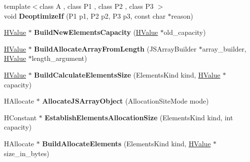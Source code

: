 \begin{DoxyCompactItemize}
\item 
\hypertarget{classv8_1_1internal_1_1_h_graph_builder_a66f8a692fe2de68eeace6a5cfad72efe}{}{\footnotesize template$<$class A , class P1 , class P2 , class P3 $>$ }\\void {\bfseries Deoptimize\+If} (P1 p1, P2 p2, P3 p3, const char $\ast$reason)\label{classv8_1_1internal_1_1_h_graph_builder_a66f8a692fe2de68eeace6a5cfad72efe}

\item 
\hypertarget{classv8_1_1internal_1_1_h_graph_builder_aae8a99189e14174540b8e6720b39fb76}{}\hyperlink{classv8_1_1internal_1_1_h_value}{H\+Value} $\ast$ {\bfseries Build\+New\+Elements\+Capacity} (\hyperlink{classv8_1_1internal_1_1_h_value}{H\+Value} $\ast$old\+\_\+capacity)\label{classv8_1_1internal_1_1_h_graph_builder_aae8a99189e14174540b8e6720b39fb76}

\item 
\hypertarget{classv8_1_1internal_1_1_h_graph_builder_a13b29de0ba2ac4d2683acec621ae783d}{}\hyperlink{classv8_1_1internal_1_1_h_value}{H\+Value} $\ast$ {\bfseries Build\+Allocate\+Array\+From\+Length} (J\+S\+Array\+Builder $\ast$array\+\_\+builder, \hyperlink{classv8_1_1internal_1_1_h_value}{H\+Value} $\ast$length\+\_\+argument)\label{classv8_1_1internal_1_1_h_graph_builder_a13b29de0ba2ac4d2683acec621ae783d}

\item 
\hypertarget{classv8_1_1internal_1_1_h_graph_builder_a993d18a4444924ee5dcee91fedfab723}{}\hyperlink{classv8_1_1internal_1_1_h_value}{H\+Value} $\ast$ {\bfseries Build\+Calculate\+Elements\+Size} (Elements\+Kind kind, \hyperlink{classv8_1_1internal_1_1_h_value}{H\+Value} $\ast$capacity)\label{classv8_1_1internal_1_1_h_graph_builder_a993d18a4444924ee5dcee91fedfab723}

\item 
\hypertarget{classv8_1_1internal_1_1_h_graph_builder_ab78c23015a1be8b65ed8e9ad8f370cac}{}H\+Allocate $\ast$ {\bfseries Allocate\+J\+S\+Array\+Object} (Allocation\+Site\+Mode mode)\label{classv8_1_1internal_1_1_h_graph_builder_ab78c23015a1be8b65ed8e9ad8f370cac}

\item 
\hypertarget{classv8_1_1internal_1_1_h_graph_builder_a5c1d8c722b0a399dbd0514dbabeb3c8a}{}H\+Constant $\ast$ {\bfseries Establish\+Elements\+Allocation\+Size} (Elements\+Kind kind, int capacity)\label{classv8_1_1internal_1_1_h_graph_builder_a5c1d8c722b0a399dbd0514dbabeb3c8a}

\item 
\hypertarget{classv8_1_1internal_1_1_h_graph_builder_a0aae5017ce562a06089659a4e6e60965}{}H\+Allocate $\ast$ {\bfseries Build\+Allocate\+Elements} (Elements\+Kind kind, \hyperlink{classv8_1_1internal_1_1_h_value}{H\+Value} $\ast$size\+\_\+in\+\_\+bytes)\label{classv8_1_1internal_1_1_h_graph_builder_a0aae5017ce562a06089659a4e6e60965}


\end{DoxyCompactItemize}
